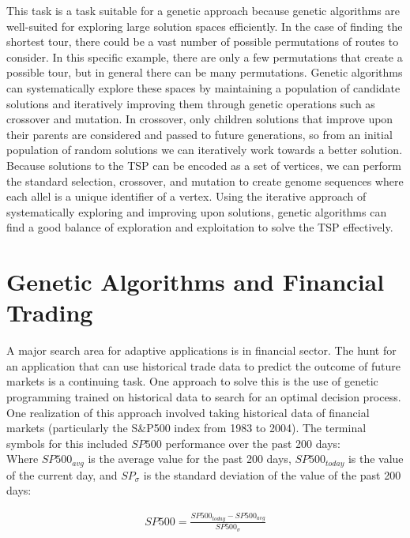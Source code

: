 \documentclass{article}
\renewcommand{\_}{\ifincsname_\else\legacyunderscore\fi}
\begin{document}
This task is a task suitable for a genetic approach because genetic algorithms are well-suited for exploring large solution spaces efficiently. In the case of finding the shortest tour, there could be a vast number of possible permutations of routes to consider. In this specific example, there are only a few permutations that create a possible tour, but in general there can be many permutations. Genetic algorithms can systematically explore these spaces by maintaining a population of candidate solutions and iteratively improving them through genetic operations such as crossover and mutation. In crossover, only children solutions that improve upon their parents are considered and passed to future generations, so from an initial population of random solutions we can iteratively work towards a better solution. Because solutions to the TSP can be encoded as a set of vertices, we can perform the standard selection, crossover, and mutation to create genome sequences where each allel is a unique identifier of a vertex. Using the iterative approach of systematically exploring and improving upon solutions, genetic algorithms can find a good balance of exploration and exploitation to solve the TSP effectively.  

\section*{Genetic Algorithms and Financial Trading}
A major search area for adaptive applications is in financial sector. The hunt for an application that can use historical trade data to predict the outcome of future markets is a continuing task. One approach to solve this is the use of genetic programming trained on historical data to search for an optimal decision process. One realization of this approach involved taking historical data of financial markets (particularly the S\&P500 index from 1983 to 2004). The terminal symbols for this included \textbf{$SP500$} performance over the past 200 days:\\
Where $SP500_{avg}$ is the average value for the past 200 days, $SP500_{today}$ is the value of the current day, and $SP_\sigma$ is the standard deviation of the value of the past 200 days:

\begin{equation}
    \begin{aligned}
     SP500 = \frac{SP500_{today} - SP500_{avg}}{SP500_\sigma}
     \end{aligned}
\end{equation}
\end{document}

